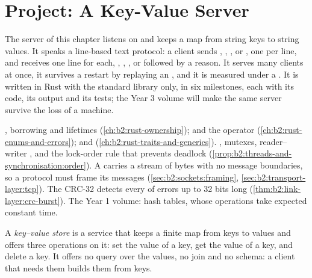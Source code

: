 \chapter{Project: A Key-Value Server}\label{ch:b2:project-key-value-server}

The server of this chapter listens on  and keeps a map from string keys to string values. It
speaks a line-based text protocol: a client sends , , ,  or
, one per line, and receives one line for each, , , ,  or
 followed by a reason. It serves many clients at once, it survives a restart by replaying an ,
and it is measured under a . It is written in Rust with the standard library only, in six milestones, each with
its code, its output and its tests; the Year 3 volume will make the same server survive the loss of a machine.

\begin{recall}
, borrowing and lifetimes (\cref{ch:b2:rust-ownership});  and the  operator
(\cref{ch:b2:rust-enums-and-errors});  and  (\cref{ch:b2:rust-traits-and-generics}). ,
mutexes, reader--writer , and the lock-order rule that prevents deadlock
(\cref{prop:b2:threads-and-synchronisation:order}). A  carries a stream of bytes with no message boundaries,
so a protocol must frame its messages (\cref{sec:b2:sockets:framing}, \cref{sec:b2:transport-layer:tcp}). The CRC-32
detects every  of errors up to 32 bits long (\cref{thm:b2:link-layer:crc-burst}). The Year 1 volume: hash tables,
whose operations take expected constant time.
\end{recall}

\begin{definition}\label{def:b2:project-key-value-server:kv}
A \emph{key--value store} is a service that keeps a finite map from keys to values and offers
three operations on it: set the value of a key, get the value of a key, and delete a key. It offers no query over the
values, no join and no schema: a client that needs them builds them from keys.
\end{definition}

